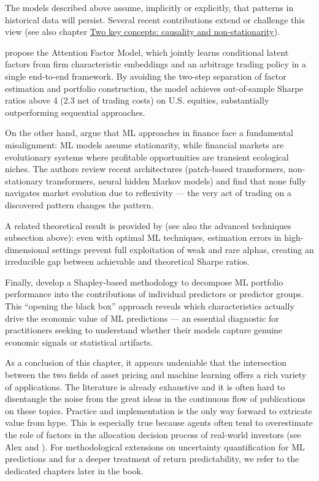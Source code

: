 The models described above assume, implicitly or explicitly, that patterns in historical data will persist. Several recent contributions extend or challenge this view (see also chapter \href{/chap-20-causality}{Two key concepts: causality and non-stationarity}).

\cite{epstein2025attention} propose the Attention Factor Model, which jointly learns conditional latent factors from firm characteristic embeddings and an arbitrage trading policy in a single end-to-end framework. By avoiding the two-step separation of factor estimation and portfolio construction, the model achieves out-of-sample Sharpe ratios above 4 (2.3 net of trading costs) on U.S. equities, substantially outperforming sequential approaches.

On the other hand, \cite{allen2025modern} argue that ML approaches in finance face a fundamental misalignment: ML models assume stationarity, while financial markets are evolutionary systems where profitable opportunities are transient ecological niches. The authors review recent architectures (patch-based transformers, non-stationary transformers, neural hidden Markov models) and find that none fully navigates market evolution due to reflexivity --- the very act of trading on a discovered pattern changes the pattern.

A related theoretical result is provided by \cite{danagel2024statistical} (see also the advanced techniques subsection above): even with optimal ML techniques, estimation errors in high-dimensional settings prevent full exploitation of weak and rare alphas, creating an irreducible gap between achievable and theoretical Sharpe ratios.

Finally, \cite{coulombe2024anatomy} develop a Shapley-based methodology to decompose ML portfolio performance into the contributions of individual predictors or predictor groups. This ``opening the black box'' approach reveals which characteristics actually drive the economic value of ML predictions --- an essential diagnostic for practitioners seeking to understand whether their models capture genuine economic signals or statistical artifacts.

As a conclusion of this chapter, it appears undeniable that the intersection between the two fields of asset pricing and machine learning offers a rich variety of applications. The literature is already exhaustive and it is often hard to disentangle the noise from the great ideas in the continuous flow of publications on these topics. Practice and implementation is the only way forward to extricate value from hype. This is especially true because agents often tend to overestimate the role of factors in the allocation decision process of real-world investors (see Alex \cite{chinco2019risk} and \cite{castaneda2019microfounding}). For methodological extensions on uncertainty quantification for ML predictions and for a deeper treatment of return predictability, we refer to the dedicated chapters later in the book.

